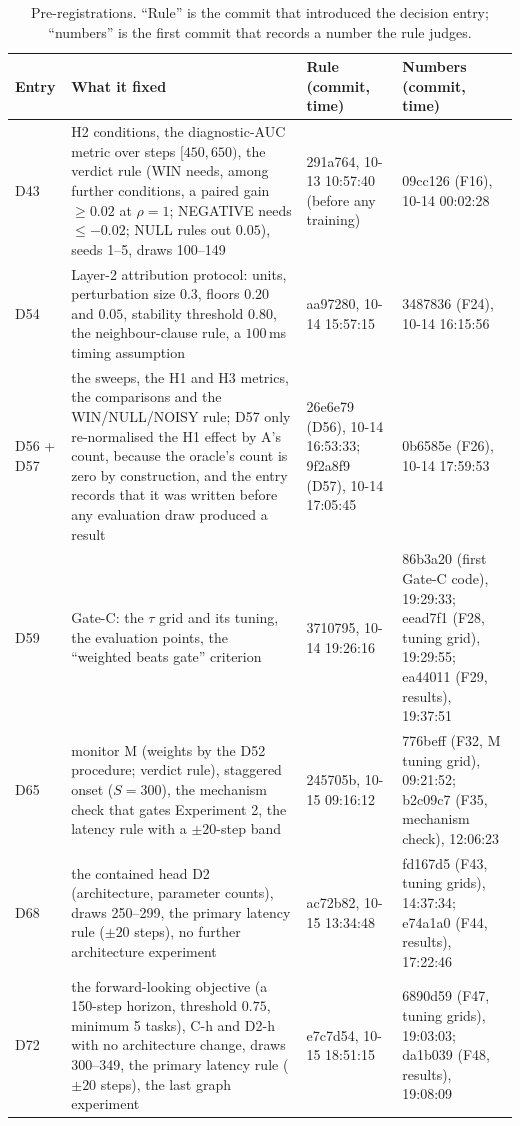 \begin{table}[t]
\centering
\caption{Pre-registrations. ``Rule'' is the commit that introduced the decision entry; ``numbers'' is the first commit that records a number the rule judges.}
\label{tab:prereg}
\small
\begin{tabular}{@{}lp{6.6cm}p{3.3cm}p{4.4cm}@{}}
\toprule
Entry & What it fixed & Rule (commit, time) & Numbers (commit, time) \\
\midrule
D43 & H2 conditions, the diagnostic-AUC metric over steps $[450,650)$, the verdict rule (WIN needs, among further conditions, a paired gain $\ge 0.02$ at $\rho=1$; NEGATIVE needs $\le -0.02$; NULL rules out $0.05$), seeds 1--5, draws 100--149 & 291a764, 10-13 10:57:40 (before any training) & 09cc126 (F16), 10-14 00:02:28 \\
D54 & Layer-2 attribution protocol: units, perturbation size $0.3$, floors $0.20$ and $0.05$, stability threshold $0.80$, the neighbour-clause rule, a $100$\,ms timing assumption & aa97280, 10-14 15:57:15 & 3487836 (F24), 10-14 16:15:56 \\
D56 + D57 & the sweeps, the H1 and H3 metrics, the comparisons and the WIN/NULL/NOISY rule; D57 only re-normalised the H1 effect by A's count, because the oracle's count is zero by construction, and the entry records that it was written before any evaluation draw produced a result & 26e6e79 (D56), 10-14 16:53:33; 9f2a8f9 (D57), 10-14 17:05:45 & 0b6585e (F26), 10-14 17:59:53 \\
D59 & Gate-C: the $\tau$ grid and its tuning, the evaluation points, the ``weighted beats gate'' criterion & 3710795, 10-14 19:26:16 & 86b3a20 (first Gate-C code), 19:29:33; eead7f1 (F28, tuning grid), 19:29:55; ea44011 (F29, results), 19:37:51 \\
D65 & monitor M (weights by the D52 procedure; verdict rule), staggered onset ($S=300$), the mechanism check that gates Experiment 2, the latency rule with a $\pm 20$-step band & 245705b, 10-15 09:16:12 & 776beff (F32, M tuning grid), 09:21:52; b2c09c7 (F35, mechanism check), 12:06:23 \\
D68 & the contained head D2 (architecture, parameter counts), draws 250--299, the primary latency rule ($\pm 20$ steps), no further architecture experiment & ac72b82, 10-15 13:34:48 & fd167d5 (F43, tuning grids), 14:37:34; e74a1a0 (F44, results), 17:22:46 \\
D72 & the forward-looking objective (a 150-step horizon, threshold $0.75$, minimum 5 tasks), C-h and D2-h with no architecture change, draws 300--349, the primary latency rule ($\pm 20$ steps), the last graph experiment & e7c7d54, 10-15 18:51:15 & 6890d59 (F47, tuning grids), 19:03:03; da1b039 (F48, results), 19:08:09 \\

\end{tabular}
\end{table}
